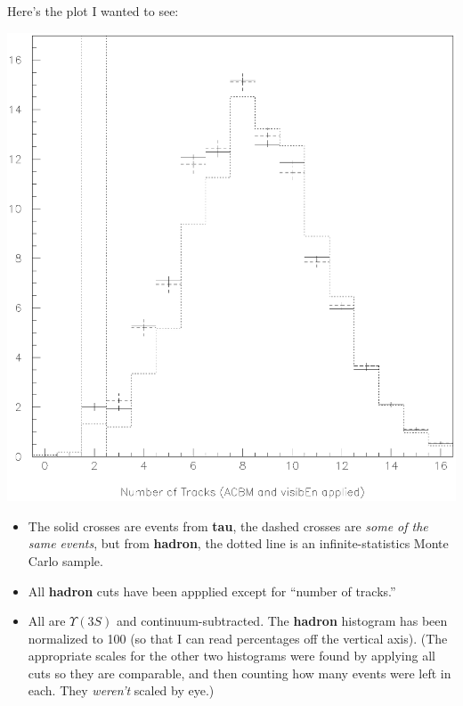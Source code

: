 \documentclass{article}
\begin{document}
\pagebreak
Here's the plot I wanted to see:
\begin{center}
  \vspace{-1 cm}
  \includegraphics[width=\linewidth]{ntracks.eps}
\end{center}
\begin{itemize}

  \item The solid crosses are events from {\bf tau}, the dashed
  crosses are {\it some of the same events}, but from {\bf hadron},
  the dotted line is an infinite-statistics Monte Carlo sample.

  \item All {\bf hadron} cuts have been appplied except for ``number
  of tracks.''

  \item All are $\Upsilon(3S)$ and continuum-subtracted.  The {\bf
  hadron} histogram has been normalized to 100 (so that I can read
  percentages off the vertical axis).  (The appropriate scales for the
  other two histograms were found by applying all cuts so they are
  comparable, and then counting how many events were left in each.
  They {\it weren't} scaled by eye.)

\end{itemize}
\end{document}
